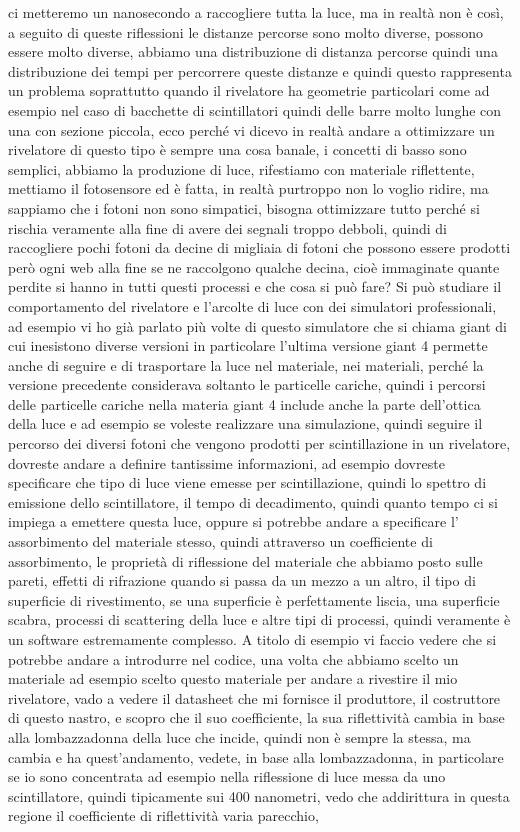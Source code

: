 ci metteremo un nanosecondo a raccogliere tutta la luce, ma in realtà non è così, a seguito di queste riflessioni le distanze percorse sono molto diverse, possono essere molto diverse, abbiamo una distribuzione di distanza percorse quindi una distribuzione dei tempi per percorrere queste distanze e quindi questo rappresenta un problema soprattutto quando il rivelatore ha geometrie particolari come ad esempio nel caso di bacchette di scintillatori quindi delle barre molto lunghe con una con sezione piccola, ecco perché vi dicevo in realtà andare a ottimizzare un rivelatore di questo tipo è sempre una cosa banale, i concetti di basso sono semplici, abbiamo la produzione di luce, rifestiamo con materiale riflettente, mettiamo il fotosensore ed è fatta, in realtà purtroppo non lo voglio ridire, ma sappiamo che i fotoni non sono simpatici, bisogna ottimizzare tutto perché si rischia veramente alla fine di avere dei segnali troppo debboli, quindi di raccogliere pochi fotoni da decine di migliaia di fotoni che possono essere prodotti però ogni web alla fine se ne raccolgono qualche decina, cioè immaginate quante perdite si hanno in tutti questi processi e che cosa si può fare? Si può studiare il comportamento del rivelatore e l'arcolte di luce con dei simulatori professionali, ad esempio vi ho già parlato più volte di questo simulatore che si chiama giant di cui inesistono diverse versioni in particolare l'ultima versione giant 4 permette anche di seguire e di trasportare la luce nel materiale, nei materiali, perché la versione precedente considerava soltanto le particelle cariche, quindi i percorsi delle particelle cariche nella materia giant 4 include anche la parte dell'ottica della luce e ad esempio se voleste realizzare una simulazione, quindi seguire il percorso dei diversi fotoni che vengono prodotti per scintillazione in un rivelatore, dovreste andare a definire tantissime informazioni, ad esempio dovreste specificare che tipo di luce viene emesse per scintillazione, quindi lo spettro di emissione dello scintillatore, il tempo di decadimento, quindi quanto tempo ci si impiega a emettere questa luce, oppure si potrebbe andare a specificare l' assorbimento del materiale stesso, quindi attraverso un coefficiente di assorbimento, le proprietà di riflessione del materiale che abbiamo posto sulle pareti, effetti di rifrazione quando si passa da un mezzo a un altro, il tipo di superficie di rivestimento, se una superficie è perfettamente liscia, una superficie scabra, processi di scattering della luce e altre tipi di processi, quindi veramente è un software estremamente complesso. A titolo di esempio vi faccio vedere che si potrebbe andare a introdurre nel codice, una volta che abbiamo scelto un materiale ad esempio scelto questo materiale per andare a rivestire il mio rivelatore, vado a vedere il datasheet che mi fornisce il produttore, il costruttore di questo nastro, e scopro che il suo coefficiente, la sua riflettività cambia in base alla lombazzadonna della luce che incide, quindi non è sempre la stessa, ma cambia e ha quest'andamento, vedete, in base alla lombazzadonna, in particolare se io sono concentrata ad esempio nella riflessione di luce messa da uno scintillatore, quindi tipicamente sui 400 nanometri, vedo che addirittura in questa regione il coefficiente di riflettività varia parecchio,

